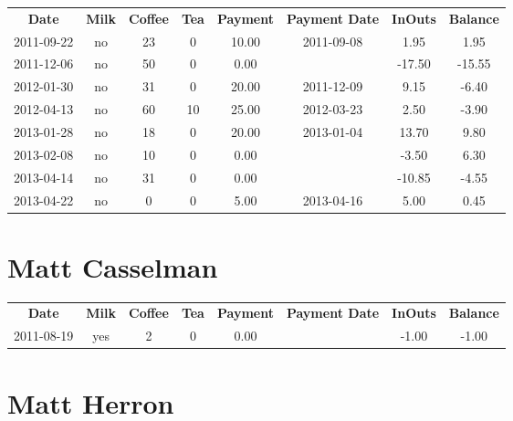 \begin{center}
\begin{tabular}{cccccccc}
\textbf{Date} & \textbf{Milk} & \textbf{Coffee} & \textbf{Tea} & \textbf{Payment} & \textbf{Payment Date} & \textbf{InOuts} & \textbf{Balance} \\
2011-09-22 & no & 23 &  0 & 10.00 & 2011-09-08 &   1.95 &   1.95\\ 
2011-12-06 & no & 50 &  0 &  0.00 &  & -17.50 & -15.55\\ 
2012-01-30 & no & 31 &  0 & 20.00 & 2011-12-09 &   9.15 &  -6.40\\ 
2012-04-13 & no & 60 & 10 & 25.00 & 2012-03-23 &   2.50 &  -3.90\\ 
2013-01-28 & no & 18 &  0 & 20.00 & 2013-01-04 &  13.70 &   9.80\\ 
2013-02-08 & no & 10 &  0 &  0.00 &  &  -3.50 &   6.30\\ 
2013-04-14 & no & 31 &  0 &  0.00 &  & -10.85 &  -4.55\\ 
2013-04-22 & no &  0 &  0 &  5.00 & 2013-04-16 &   5.00 &   0.45
\end{tabular}
\end{center}

\section{Matt Casselman}

\begin{center}
\begin{tabular}{cccccccc}
\textbf{Date} & \textbf{Milk} & \textbf{Coffee} & \textbf{Tea} & \textbf{Payment} & \textbf{Payment Date} & \textbf{InOuts} & \textbf{Balance} \\
2011-08-19 & yes & 2 & 0 & 0.00 &  & -1.00 & -1.00
\end{tabular}
\end{center}

\section{Matt Herron}

